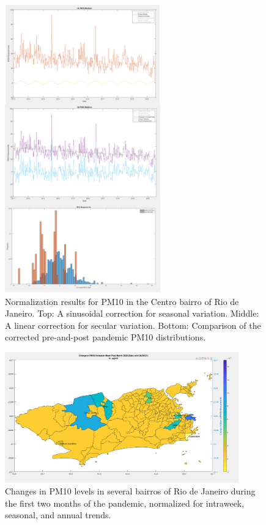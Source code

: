\clearpage

\begin{figure}[H]
\centering
\includegraphics[width=0.6\textwidth]{Figures/chap5/aq-combined.png}
\caption[PM10 Normalization for the Centro bairro of Rio de Janeiro]{Normalization results for PM10 in the Centro bairro of Rio de Janeiro. Top: A sinusoidal correction for seasonal variation. Middle: A linear correction for secular variation. Bottom: Comparison of the corrected pre-and-post pandemic PM10 distributions.}
\label{fig:aq-combined}
\end{figure}


\begin{figure}[!htb]
\centering
\includegraphics[width=0.9\textwidth]{Figures/chap5/pm10.png}
\caption[Changes in PM10 in Rio de Janeiro]{Changes in PM10 levels in several bairros of Rio de Janeiro during the first two months of the pandemic, normalized for intraweek, seasonal, and annual trends.}
\label{fig:pm}
\end{figure}

